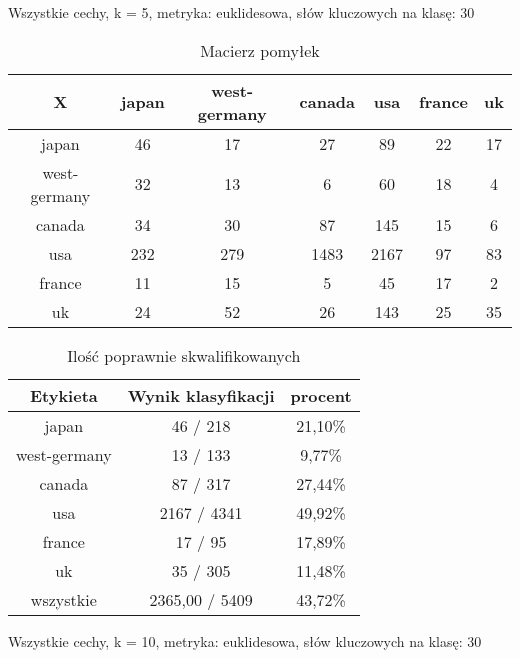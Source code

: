 \documentclass{classrep}
\begin{document}
\newpage
Wszystkie cechy, k = 5, metryka: euklidesowa, słów kluczowych na klasę: 30\newline


\begin{table}[h]
\centering
\begin{tabular}{|c|c|c|c|c|c|c|}
\hline
 X  & japan & west-germany & canada & usa & france & uk\\
\hline
japan & 46 & 17 & 27 & 89 & 22 & 17\\
\hline
west-germany & 32 & 13 & 6 & 60 & 18 & 4\\
\hline
canada & 34 & 30 & 87 & 145 & 15 & 6\\
\hline
usa & 232 & 279 & 1483 & 2167 & 97 & 83\\
\hline
france & 11 & 15 & 5 & 45 & 17 & 2\\
\hline
uk & 24 & 52 & 26 & 143 & 25 & 35\\
\hline
\end{tabular}
\caption{Macierz pomyłek}\end{table}

\begin{table}[h]
\centering
\begin{tabular}{|c|c|c|}
\hline
Etykieta & Wynik klasyfikacji & procent\\
\hline
japan & 46 / 218 & 21,10\%\\
\hline
west-germany & 13 / 133 & 9,77\%\\
\hline
canada & 87 / 317 & 27,44\%\\
\hline
usa & 2167 / 4341 & 49,92\%\\
\hline
france & 17 / 95 & 17,89\%\\
\hline
uk & 35 / 305 & 11,48\%\\
\hline
wszystkie & 2365,00 / 5409 & 43,72\%\\
\hline
\end{tabular}
\caption{Ilość poprawnie skwalifikowanych}\end{table}

















Wszystkie cechy, k = 10, metryka: euklidesowa, słów kluczowych na klasę: 30\newline
\end{document}
